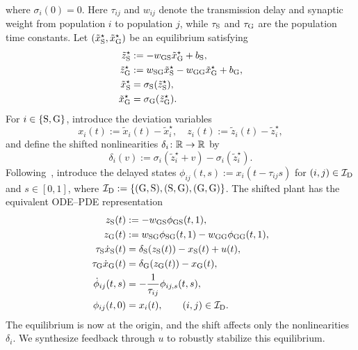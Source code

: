 where $\sigma_i(0)=0$. Here $\tau_{ij}$ and $w_{ij}$ denote the transmission
delay and synaptic weight from population $i$ to population $j$, while
$\tau_{{\mathrm{S}}}$ and $\tau_{{\mathrm{G}}}$ are the population time constants.
Let $(\tilde x_{{\mathrm{S}}}^\star,\tilde x_{{\mathrm{G}}}^\star)$ be an equilibrium
satisfying
\begin{align*}
      \tilde z_{{\mathrm{S}}}^\star&:=-w_{{\mathrm{GS}}}\tilde x_{{\mathrm{G}}}^\star+b_{{\mathrm{S}}},\\
      \tilde z_{{\mathrm{G}}}^\star&:=w_{{\mathrm{SG}}}\tilde x_{{\mathrm{S}}}^\star
          -w_{{\mathrm{GG}}}\tilde x_{{\mathrm{G}}}^\star+b_{{\mathrm{G}}},\\
      \tilde x_{{\mathrm{S}}}^\star
          &=\sigma_{{\mathrm{S}}}(\tilde z_{{\mathrm{S}}}^\star),\\
      \tilde x_{{\mathrm{G}}}^\star
          &=\sigma_{{\mathrm{G}}}(\tilde z_{{\mathrm{G}}}^\star).
\end{align*}
For $i\in\{{\mathrm{S}},{\mathrm{G}}\}$, introduce the deviation variables
\begin{equation*}
x_i(t):=\tilde{x}_i(t)-\tilde x_i^\star,
\quad
z_i(t):=\tilde{z}_i(t)-\tilde z_i^\star,
\end{equation*}
and define the shifted nonlinearities $\delta_i\colon\mathbb{R}\to\mathbb{R}$ by
\begin{equation*}
\delta_i(v):=\sigma_i(\tilde z_i^\star+v)-\sigma_i(\tilde z_i^\star).
\end{equation*}
Following~\cite{peet2020representationnetworkssystemsdelay}, introduce
the delayed states $\phi_{ij}(t,s):=x_i(t-\tau_{ij}s)$ for
$(i,j)\in\mathcal{I}_{{\mathrm{D}}}$ and $s\in[0,1]$, where
$\mathcal{I}_{{\mathrm{D}}}:=\{({\mathrm{G}},{\mathrm{S}}),({\mathrm{S}},{\mathrm{G}}),({\mathrm{G}},{\mathrm{G}})\}$.
The shifted plant has the equivalent ODE--PDE representation
\begin{equation}\label{eq:stn-gpe_ode-pde}
\begin{aligned}
z_{{\mathrm{S}}}(t)
    &:= -w_{{\mathrm{GS}}}\phi_{{\mathrm{GS}}}(t,1),\\
z_{{\mathrm{G}}}(t)
    &:= w_{{\mathrm{SG}}}\phi_{{\mathrm{SG}}}(t,1)
        -w_{{\mathrm{GG}}}\phi_{{\mathrm{GG}}}(t,1),\\
\tau_{{\mathrm{S}}}\dot{x}_{{\mathrm{S}}}(t)
    &= \delta_{{\mathrm{S}}}(z_{{\mathrm{S}}}(t))-x_{{\mathrm{S}}}(t)+u(t),\\
\tau_{{\mathrm{G}}}\dot{x}_{{\mathrm{G}}}(t)
    &= \delta_{{\mathrm{G}}}(z_{{\mathrm{G}}}(t))-x_{{\mathrm{G}}}(t),\\
\dot{\phi}_{ij}(t,s)
    &= -\frac{1}{\tau_{ij}}\phi_{ij,s}(t,s),\\
\phi_{ij}(t,0)
    &= x_i(t),\qquad (i,j)\in\mathcal{I}_{{\mathrm{D}}}.
\end{aligned}
\end{equation}
The equilibrium is now at the origin, and the shift affects only the
nonlinearities $\delta_i$. We synthesize feedback through $u$ to robustly
stabilize this equilibrium.

